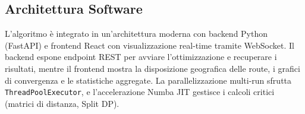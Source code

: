 \subsection{Architettura Software}

L'algoritmo \`e integrato in un'architettura moderna con backend Python
(FastAPI) \cite{fastapi} e frontend React con visualizzazione real-time tramite
WebSocket. Il backend espone endpoint REST per avviare l'ottimizzazione e
recuperare i risultati, mentre il frontend mostra la disposizione geografica
delle route, i grafici di convergenza e le statistiche aggregate. La
parallelizzazione multi-run sfrutta \texttt{ThreadPoolExecutor}, e
l'accelerazione Numba JIT \cite{lam2015numba} gestisce i calcoli critici
(matrici di distanza, Split DP).
